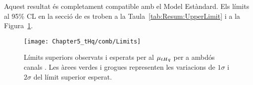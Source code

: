 
Aquest resultat és completament compatible amb el Model Estàndard. Els límits al 95\% CL en la secció de \tHq es troben a la Taula~\ref{tab:Resum:UpperLimit} i a la Figura~\ref{fig:Resum:UpperLimits}.
\begin{figure}[h] 
\centering
  \texttt{[image: Chapter5\_tHq/comb/Limits]}
\caption{Límits superiors observats i esperats per al $\mu_{tHq}$ per a ambdós canals \dileptau. Les àrees verdes i grogues representen les variacions de $1\sigma$ i $2\sigma$ del límit superior esperat.}
\label{fig:Resum:UpperLimits}
\end{figure}


